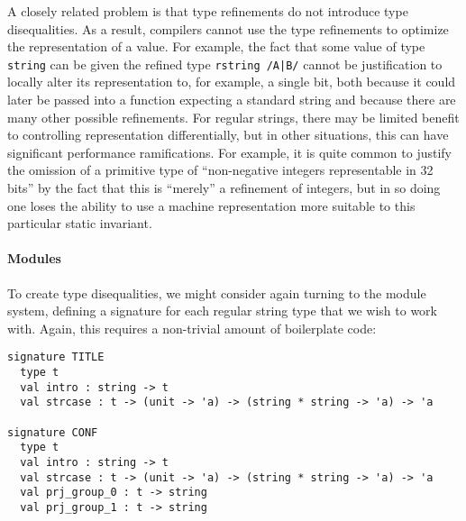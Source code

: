 A closely related problem is that type refinements do not introduce type disequalities. As a result, compilers cannot use the type refinements to optimize the representation of a value. For example, the fact that some value of type \lstinline{string} can be given the refined type \lstinline{rstring /A|B/} cannot be justification to locally alter its representation to, for example, a single bit, both because it could later be passed into a function expecting a standard string and because there are many other possible refinements. For regular strings, there may be limited benefit to controlling representation differentially, but in other situations, this can have significant performance ramifications. For example, it is quite common to justify the omission of a primitive type of ``non-negative integers representable in 32 bits'' by the fact that this is ``merely'' a refinement of integers, but in so doing one loses the ability to use a machine representation more suitable to this particular static invariant.%



\paragraph{Modules}
To create type disequalities, we might consider again turning to the module system, defining a signature for each regular string type that we wish to work with. Again, this requires a non-trivial amount of boilerplate code:
\begin{lstlisting}[numbers=none]
signature TITLE
  type t
  val intro : string -> t
  val strcase : t -> (unit -> 'a) -> (string * string -> 'a) -> 'a

signature CONF
  type t
  val intro : string -> t
  val strcase : t -> (unit -> 'a) -> (string * string -> 'a) -> 'a
  val prj_group_0 : t -> string
  val prj_group_1 : t -> string
\end{lstlisting}


